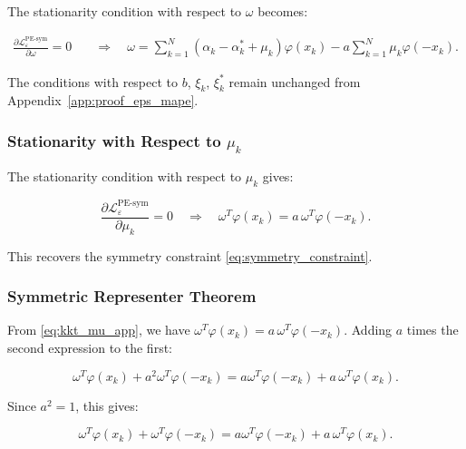 \documentclass[mathematics,article,submit,pdftex,moreauthors]{Definitions/mdpi}
\begin{document}
The stationarity condition with respect to $\omega$ becomes:
\begin{linenomath}
\begin{equation}\label{eq:kkt_sym_omega_app}
\begin{aligned}
\frac{\partial\mathcal{L}_{\varepsilon}^{\mathrm{PE\text{-}sym}}}{\partial\omega} = 0 
&\quad \Rightarrow \quad 
\omega = \sum_{k=1}^N (\alpha_k - \alpha_k^* + \mu_k)\varphi(x_k) - a\sum_{k=1}^N \mu_k\varphi(-x_k).
\end{aligned}
\end{equation}
\end{linenomath}

The conditions with respect to $b$, $\xi_k$, $\xi_k^*$ remain unchanged from Appendix~\ref{app:proof_eps_mape}.

\subsubsection{Stationarity with Respect to $\mu_k$}

The stationarity condition with respect to $\mu_k$ gives:
\begin{linenomath}
\begin{equation}\label{eq:kkt_mu_app}
\frac{\partial\mathcal{L}_{\varepsilon}^{\mathrm{PE\text{-}sym}}}{\partial\mu_k} = 0 
\quad \Rightarrow \quad 
\omega^T\varphi(x_k) = a\,\omega^T\varphi(-x_k).
\end{equation}
\end{linenomath}

This recovers the symmetry constraint \eqref{eq:symmetry_constraint}.

\subsubsection{Symmetric Representer Theorem}

From \eqref{eq:kkt_mu_app}, we have $\omega^T\varphi(x_k) = a\,\omega^T\varphi(-x_k)$. 
Adding $a$ times the second expression to the first:
\begin{linenomath}
\begin{equation}
\omega^T\varphi(x_k) + a^2\omega^T\varphi(-x_k) = a\omega^T\varphi(-x_k) + a\,\omega^T\varphi(x_k).
\end{equation}
\end{linenomath}

Since $a^2 = 1$, this gives:
\begin{linenomath}
\begin{equation}
\omega^T\varphi(x_k) + \omega^T\varphi(-x_k) = a\omega^T\varphi(-x_k) + a\,\omega^T\varphi(x_k).
\end{equation}
\end{linenomath}
\end{document}
